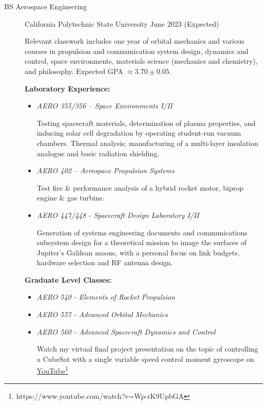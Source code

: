 \documentclass{article}[11pt]
\begin{document}
\begin{description}
\item[BS Aerospace Engineering] {\small\color{CalPolyGreen}California Polytechnic State University} \hfill June 2023 (Expected)

\def\labelitemi{$\rightarrow$}

Relevant classwork includes one year of orbital mechanics and various courses in propulsion and communication system design, dynamics and control, space environments, materials science (mechanics and chemistry), and philosophy. Expected GPA $\approx 3.70 \pm 0.05$.

\def\labelitemi{$\circ$}

\textbf{Laboratory Experience:}

\begin{itemize}
\item \textit{AERO 355/356 – Space Environments I/II}

\quad Testing spacecraft materials, determination of plasma properties, and inducing solar cell degradation by operating student-run vacuum chambers. Thermal analysis; manufacturing of a multi-layer insulation analogue and basic radiation shielding.

\item \textit{AERO 402 – Aerospace Propulsion Systems}

Test fire \& performance analysis of a hybrid rocket motor, biprop engine \& gas turbine.

\item \textit{AERO 447/448 - Spacecraft Design Laboratory I/II}

\quad Generation of systems engineering documents and  communications subsystem design for a theoretical mission to image the surfaces of Jupiter's Galilean moons, with a personal focus on link budgets, hardware selection and RF antenna design.
\end{itemize}

\textbf{Graduate Level Classes:}

\begin{itemize}
\item \textit{AERO 540 - Elements of Rocket Propulsion}

\item \textit{AERO 557 - Advanced Orbital Mechanics}

\item \textit{AERO 560 - Advanced Spacecraft Dynamics and Control}

\quad Watch my virtual final project presentation on the topic of controlling a CubeSat with a single variable speed control moment gyroscope on \href{https://www.youtube.com/watch?v=Wp-rK9UpbGA}{YouTube}\footnote[0]{https://www.youtube.com/watch?v=Wp-rK9UpbGA}


\end{itemize}
\end{description}
\end{document}
